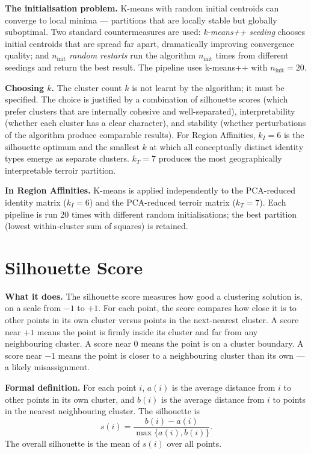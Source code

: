 \documentclass[11pt]{article}
\begin{document}
\textbf{The initialisation problem.} K-means with random initial centroids can converge to local minima --- partitions that are locally stable but globally suboptimal. Two standard countermeasures are used: \emph{k-means++ seeding} chooses initial centroids that are spread far apart, dramatically improving convergence quality; and \emph{$n_\text{init}$ random restarts} run the algorithm $n_\text{init}$ times from different seedings and return the best result. The pipeline uses k-means++ with $n_\text{init} = 20$.

\textbf{Choosing $k$.} The cluster count $k$ is not learnt by the algorithm; it must be specified. The choice is justified by a combination of silhouette scores (which prefer clusters that are internally cohesive and well-separated), interpretability (whether each cluster has a clear character), and stability (whether perturbations of the algorithm produce comparable results). For Region Affinities, $k_I = 6$ is the silhouette optimum and the smallest $k$ at which all conceptually distinct identity types emerge as separate clusters. $k_T = 7$ produces the most geographically interpretable terroir partition.

\textbf{In Region Affinities.} K-means is applied independently to the PCA-reduced identity matrix ($k_I = 6$) and the PCA-reduced terroir matrix ($k_T = 7$). Each pipeline is run 20 times with different random initialisations; the best partition (lowest within-cluster sum of squares) is retained.

\section{Silhouette Score}

\textbf{What it does.} The silhouette score measures how good a clustering solution is, on a scale from $-1$ to $+1$. For each point, the score compares how close it is to other points in its own cluster versus points in the next-nearest cluster. A score near $+1$ means the point is firmly inside its cluster and far from any neighbouring cluster. A score near 0 means the point is on a cluster boundary. A score near $-1$ means the point is closer to a neighbouring cluster than its own --- a likely misassignment.

\textbf{Formal definition.} For each point $i$, $a(i)$ is the average distance from $i$ to other points in its own cluster, and $b(i)$ is the average distance from $i$ to points in the nearest neighbouring cluster. The silhouette is
\[
s(i) = \frac{b(i) - a(i)}{\max\{a(i), b(i)\}}.
\]
The overall silhouette is the mean of $s(i)$ over all points.
\end{document}
